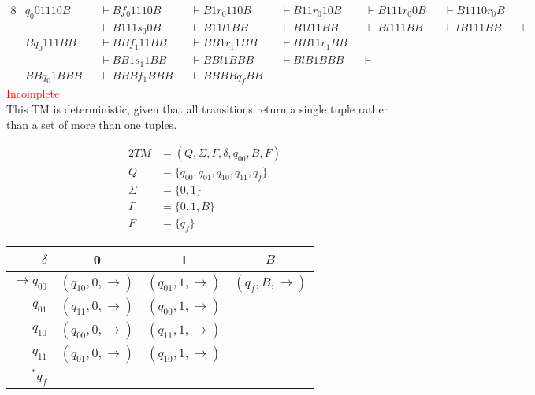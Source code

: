 \documentclass[docid=TP11]{tcom_TP}
\begin{document}
{\begin{center}
\end{center}
\begin{alignat*}{8}
	& q_0 01110B  &&\vdash B f_0 1110B &&\vdash B1 r_0 110B &&\vdash B11 r_0 10B &&\vdash B111 r_0 0B &&\vdash B1110 r_0 B &&\\
	&             &&\vdash B111 s_0 0B &&\vdash B11 l 1BB   &&\vdash B1 l 11BB   &&\vdash B l 111BB   &&\vdash l B111BB    &&\vdash \\
	& B q_0 111BB &&\vdash BB f_1 11BB &&\vdash BB1 r_1 1BB &&\vdash BB11 r_1 BB \\
	&			  &&\vdash BB1 s_1 1BB &&\vdash BB l 1BBB   &&\vdash B l B1BBB   &&\vdash\\
	& BB q_0 1BBB &&\vdash BBB f_1 BBB &&\vdash BBBB q_f BB 
\end{alignat*}
\textcolor{red}{Incomplete}\\
This TM is deterministic, given that all transitions return a single tuple rather than a set of more than one tuples.
\begin{minipage}[c]{0.5\textwidth}
	\begin{alignat*}{2}
		TM &= (Q,\Sigma, \Gamma, \delta, q_{00}, B, F)\\
		Q  &= \{q_{00},q_{01},q_{10},q_{11},q_f\}\\
		\Sigma &= \{0,1\}\\
		\Gamma &= \{0,1,B\}\\
		F      &= \{q_f\}
	\end{alignat*}
	\begin{center}
		\begin{tabular}{r | c c c}
			$\delta            $ & 0                        & 1                        & $B$ \\ \hline
			$\rightarrow q_{00}$ & $(q_{10},0,\rightarrow)$ & $(q_{01},1,\rightarrow)$ & $(q_f,B,\rightarrow)$ \\
			$            q_{01}$ & $(q_{11},0,\rightarrow)$ & $(q_{00},1,\rightarrow)$ &                       \\
			$            q_{10}$ & $(q_{00},0,\rightarrow)$ & $(q_{11},1,\rightarrow)$ &                       \\
			$            q_{11}$ & $(q_{01},0,\rightarrow)$ & $(q_{10},1,\rightarrow)$ &                       \\
			$         ^* q_f   $ &                          &                          & 

\end{tabular}
\end{center}
\end{minipage}}
\end{document}
